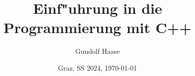 \documentclass[a4paper]{book}
\begin{document}
\title{Einf"uhrung in die Programmierung mit C++}
\author{Gundolf Haase}
\date{{\normalsize Graz, SS 2024, \today }
     }
\maketitle
	\thispagestyle{empty}
	\cleardoublepage
		\setcounter{page}{0}
\tableofcontents
	\cleardoublepage
		\setcounter{page}{0}


%
%
%
%

















\nocite{Breymann:2017:DCP,Fibelkorn:2007:SKP}
\nocite{Filipek:2018:SKP}
\nocite{Galowicz:2017:CPS,Gode:1998:ANK,Gottschling:2019:FMC,Grimm:2011:CLP,HuntThomas:2003:DPP}
\nocite{Grimm:2021:CST,Grimm:2021:CGD,Grimm:2021:CST}
\nocite{KirchPrinz:2002:OOP,Louis:2006:CPE,Meyers:1998:ECP,Meyers:1997:MEC,Meyers:2015:EMP}
\nocite{OramTalbott:1993:MPM,PombergerDobler:2008:AUD}
\nocite{SchaderKuhlins:1998:PCP,SpillnerBreymann:2016:LTP,Strasser:2003:PMS,Stroustrup:2000:CPP,Stroustrup:2010:EPC}
\nocite{Will:2012:CPT,Will:2018:CPT,Will:2020:CST,Will:2020:CMC,Will:2020:CGD}







\lstlistoflistings

\printindex
\end{document}
